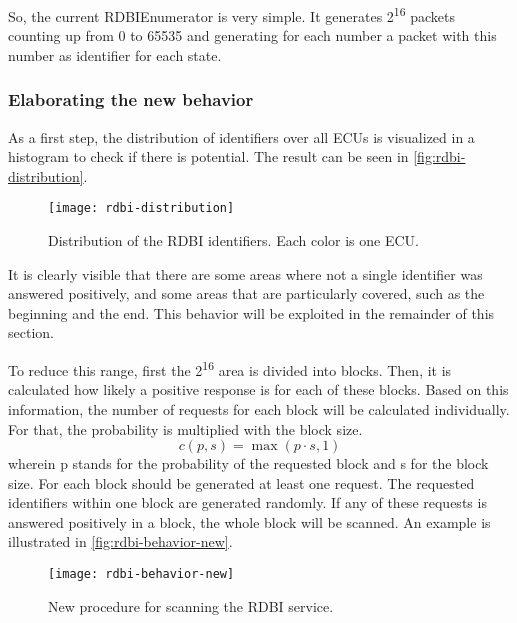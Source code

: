 So, the current RDBIEnumerator is very simple. It generates 2\textsuperscript{16} packets counting up from 0 to 65535 and generating for each number a packet with this number as identifier for each state.

\subsubsection{Elaborating the new behavior}

As a first step, the distribution of identifiers over all ECUs is visualized in a histogram to check if there is potential. The result can be seen in \autoref{fig:rdbi-distribution}.

\begin{figure}[h]
    \centering
    \texttt{[image: rdbi-distribution]}
    \caption{Distribution of the RDBI identifiers. Each color is one ECU.}
    \label{fig:rdbi-distribution}
\end{figure}

It is clearly visible that there are some areas where not a single identifier was answered positively, and some areas that are particularly covered, such as the beginning and the end. This behavior will be exploited in the remainder of this section.

To reduce this range, first the 2\textsuperscript{16} area is divided into blocks. Then, it is calculated how likely a positive response is for each of these blocks. Based on this information, the number of requests for each block will be calculated individually.
For that, the probability is multiplied with the block size.
\[c(p, s)=\max(p \cdot s, 1)\]
wherein p stands for the probability of the requested block and s for the block size. For each block should be generated at least one request. The requested identifiers within one block are generated randomly. If any of these requests is answered positively in a block, the whole block will be scanned. An example is illustrated in \autoref{fig:rdbi-behavior-new}.

\begin{figure}[h]
    \centering
    \texttt{[image: rdbi-behavior-new]}
    \caption{New procedure for scanning the RDBI service.}
    \label{fig:rdbi-behavior-new}
\end{figure}

